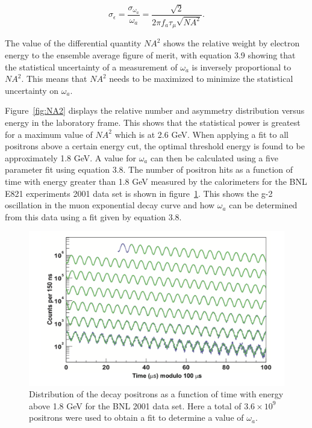 \begin{equation}
\sigma_{\epsilon} = \frac{\sigma_{\omega_{a}}}{\omega_{a}} = \frac{\sqrt{2}}{2\pi{f_{a}\tau_{\mu}}\sqrt{NA^2}}.
\end{equation}

The value of the differential quantity $NA^2$ shows the relative 
weight by electron energy to the ensemble average figure of merit, with equation 3.9 showing that the statistical uncertainty of a measurement of $\omega_{a}$ is inversely proportional to $NA^2$. This means that $NA^2$ needs to be maximized to minimize the statistical uncertainty on $\omega_{a}$\cite{Reference1}\cite{Reference29}.

Figure~\ref{fig:NA2} displays the relative number and asymmetry distribution versus energy in the laboratory frame. This shows that the statistical power is greatest for a maximum value of $NA^2$ which is at 2.6 GeV. When applying a fit to all positrons above a certain energy cut, the optimal threshold energy is found to be approximately 1.8 GeV. A value for $\omega_{a}$ can then be calculated using a five parameter fit using equation 3.8. The number of positron hits as a function of time with energy greater than 1.8 GeV measured by the calorimeters for the BNL E821 experiments 2001 data set is shown in figure~\ref{fig:wiggle}. This shows the g-2 oscillation in the muon exponential decay curve and how $\omega_{a}$ can be determined from this data using a fit given by equation 3.8. 

\begin{figure}[th]
\centering
\includegraphics[scale=0.65]{Figures/wiggle}
\decoRule
\caption{Distribution of the decay positrons as a function of time with energy above 1.8 GeV for the BNL 2001 data set. Here a total of $3.6\times10^9$ positrons were used to obtain a fit to determine a value of $\omega_{a}$.}
\label{fig:wiggle}
\end{figure}


